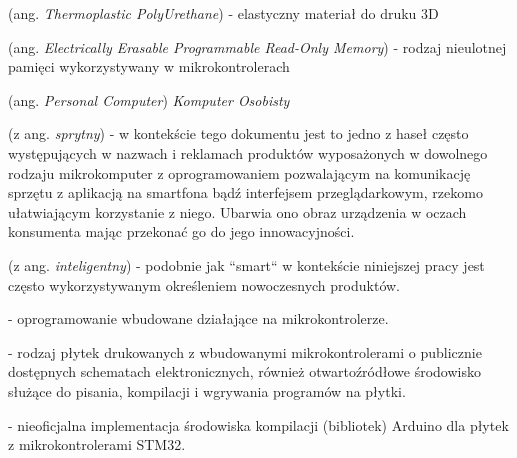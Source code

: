 \begin{description}[labelwidth=*]
  \item [TPU] (ang. \emph{Thermoplastic PolyUrethane}) - elastyczny materiał do druku 3D
  
  \item [EEPROM] (ang. \emph{Electrically Erasable Programmable Read-Only Memory}) - rodzaj nieulotnej pamięci wykorzystywany w mikrokontrolerach
  
  \item [PC] (ang. \emph{Personal Computer}) \emph{Komputer Osobisty}
  
  \item [smart] (z ang. \emph{sprytny})  - w kontekście tego dokumentu jest to jedno z haseł często występujących w nazwach i reklamach produktów wyposażonych w dowolnego rodzaju mikrokomputer z oprogramowaniem pozwalającym na komunikację sprzętu z aplikacją na smartfona bądź interfejsem przeglądarkowym, rzekomo ułatwiającym korzystanie z niego. Ubarwia ono obraz urządzenia w oczach konsumenta mając przekonać go do jego innowacyjności. 
  
  \item [intelligent] (z ang. \emph{inteligentny})  - podobnie jak ``smart`` w kontekście niniejszej pracy jest często wykorzystywanym określeniem nowoczesnych produktów.
  
  \item [Firmware] - oprogramowanie wbudowane działające na mikrokontrolerze.
  
  \item [Arduino] - rodzaj płytek drukowanych\cite{arduino-boards} z wbudowanymi mikrokontrolerami o publicznie dostępnych schematach elektronicznych, również otwartoźródłowe środowisko służące do pisania, kompilacji i wgrywania programów na płytki.
  
  \item [STM32duino] - nieoficjalna implementacja środowiska kompilacji (bibliotek) Arduino dla płytek z mikrokontrolerami STM32.
  
\end{description}
